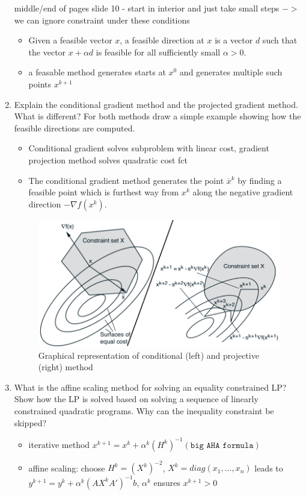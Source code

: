 \documentclass{report}
\newcommand{\question}[1]{{\small\textsf{#1}}}
\begin{document}
\begin{enumerate}
  middle/end of pages slide 10 - start in interior and just take small steps $->$ we can ignore
  constraint under these conditions
  \begin{itemize}
  \item Given a feasible vector $x$, a feasible direction at $x$ is a vector $d$ such that the
    vector $x + \alpha d$ is feasible for all sufficiently small $\alpha > 0$.
  \item a feasable method generates starts at $x^0$ and generates multiple such points $x^{k+1}$
  \end{itemize}
\item \question{Explain the conditional gradient method and the projected gradient method.  What is
    different? For both methods draw a simple example showing how the feasible directions are
    computed.}
  \begin{itemize}
  \item Conditional gradient solves subproblem with linear cost, gradient projection method solves
    quadratic cost fct
  \item The conditional gradient method generates the point $\overline{x}^k$ by finding a feasible
    point which is furthest way from $x^k$ along the negative gradient direction $-\nabla f (x^k )$.

  \end{itemize}
  \begin{figure}[H]
    \includegraphics[width=\textwidth]{proj_desc.png}
    \caption{Graphical representation of conditional (left) and projective (right) method\label{fig:proj_desc}}
  \end{figure}
\item \question{What is the affine scaling method for solving an equality constrained LP? Show how
    the LP is solved based on solving a sequence of linearly constrained quadratic programs. Why can
    the inequality constraint be skipped?}
  \begin{itemize}
  \item iterative method $x^{k+1} = x^k + \alpha^k (H^k)^{-1} (\texttt{big AHA formula})$
  \item affine scaling: choose $H^k = (X^k)^{-2}$, $X^k = diag(x_1, ..., x_n)$ leads to
    $y^{k+1} = y^k + \alpha^k (AX^k A' )^{-1} b $, $\alpha^k$ ensures $x^{k+1} > 0$
  \end{itemize}


\end{enumerate}
\end{document}

